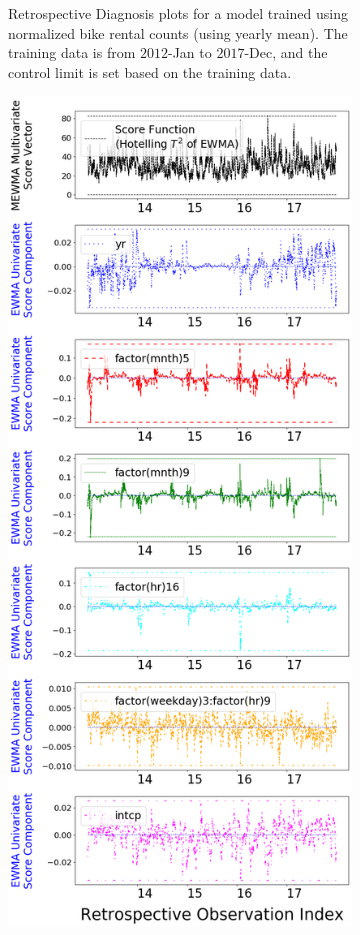 \documentclass[twoside,11pt]{article}
\begin{document}
\begin{enumerate}
\begin{figure}[H]
\begin{subfigure}[t]{0.32\linewidth}
     \captionsetup{width=.95\linewidth}
     \caption{Retrospective Diagnosis plots for a model trained using normalized bike rental counts (using yearly mean). The training data is from $2012$-Jan to $2017$-Dec, and the control limit is set based on the training data.}
     \label{fig:bs_raw_cnt_1}
\end{subfigure}
\begin{subfigure}[t]{0.32\linewidth}
     \centering
         \includegraphics[width=1.0\textwidth, trim=.0in .0in .0in .0in, clip]{../figures/v14/bike_sharing/reg_lin_C_2/PII_pos_single_retro_bike_fisher_mlines_with_regu_1e-08_0_0001_0_01_99_99.png}

\end{subfigure}
\end{figure}
\end{enumerate}
\end{document}
